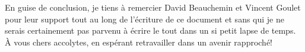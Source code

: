 En guise de conclusion, je tiens à remercier David Beauchemin et Vincent Goulet pour leur support tout au long de l'écriture de ce document et sans qui je ne serais certainement pas parvenu à écrire le tout dans un si petit lapse de temps. À vous chers accolytes, en espérant retravailler dans un avenir rapproché!
